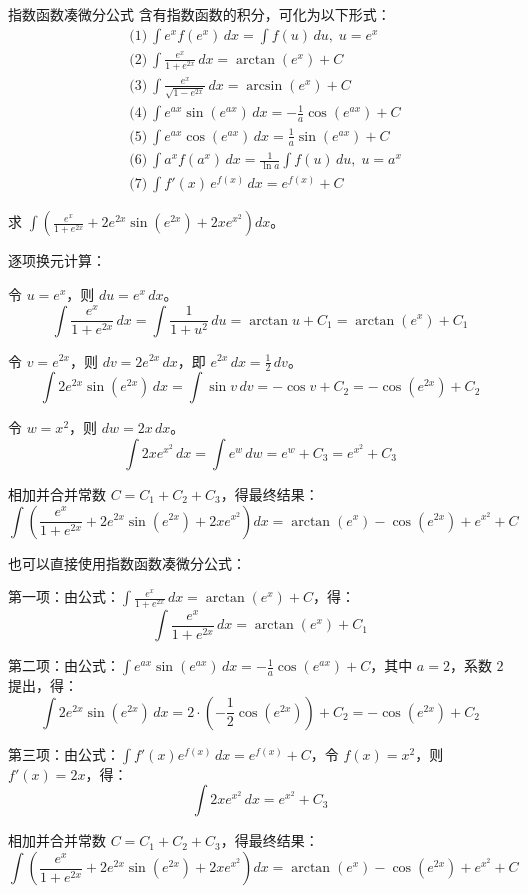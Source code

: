 \begin{theorem}{指数函数凑微分公式}{}
  含有指数函数的积分，可化为以下形式：
  \[
\begin{aligned}
&\text{(1)}\ \int e^{x} f(e^{x}) \,dx = \int f(u)\,du,\; u=e^x \\[4pt]
&\text{(2)}\ \int \frac{e^x}{1+e^{2x}} \,dx = \arctan(e^x)+C \\[4pt]
&\text{(3)}\ \int \frac{e^x}{\sqrt{1-e^{2x}}} \,dx = \arcsin(e^x)+C \\[4pt]
&\text{(4)}\ \int e^{ax}\sin(e^{ax}) \,dx = -\frac{1}{a}\cos(e^{ax})+C \\[4pt]
&\text{(5)}\ \int e^{ax}\cos(e^{ax}) \,dx = \frac{1}{a}\sin(e^{ax})+C \\[4pt]
&\text{(6)}\ \int a^x f(a^x)\,dx = \frac{1}{\ln a}\int f(u)\,du,\; u=a^x \\[4pt]
&\text{(7)}\ \int f'(x)\,e^{f(x)} \,dx = e^{f(x)}+C
\end{aligned}
\]
\end{theorem}

\begin{myexample}
  求 $\int ( \frac{e^{x}}{1+e^{2x}} + 2e^{2x}\sin(e^{2x}) + 2x e^{x^2} ) dx$。

  逐项换元计算：

令 $u = e^{x}$，则 $du = e^{x}\,dx$。
    \[
    \int \frac{e^{x}}{1+e^{2x}}\,dx = \int \frac{1}{1+u^{2}}\,du = \arctan u + C_1 = \arctan(e^{x}) + C_1
    \]

令 $v = e^{2x}$，则 $dv = 2e^{2x}\,dx$，即 $e^{2x}\,dx = \frac{1}{2}\,dv$。
    \[
    \int 2e^{2x}\sin(e^{2x})\,dx = \int \sin v\,dv = -\cos v + C_2 = -\cos(e^{2x}) + C_2
    \]

令 $w = x^{2}$，则 $dw = 2x\,dx$。
    \[
    \int 2x e^{x^{2}}\,dx = \int e^{w}\,dw = e^{w} + C_3 = e^{x^{2}} + C_3
    \]

  相加并合并常数 $C = C_1+C_2+C_3$，得最终结果：
  \[
  \int ( \frac{e^{x}}{1+e^{2x}} + 2e^{2x}\sin(e^{2x}) + 2x e^{x^2} ) dx
  = \arctan(e^x) - \cos(e^{2x}) + e^{x^2} + C
  \]

  也可以直接使用指数函数凑微分公式：

第一项：由公式：$\int \frac{e^x}{1+e^{2x}}\,dx = \arctan(e^x)+C$，得：
    \[
    \int \frac{e^{x}}{1+e^{2x}}\,dx = \arctan(e^x) + C_1
    \]

第二项：由公式：$\int e^{ax}\sin(e^{ax})\,dx = -\frac{1}{a}\cos(e^{ax})+C$，其中 $a=2$，系数 $2$ 提出，得：
    \[
    \int 2e^{2x}\sin(e^{2x})\,dx = 2\cdot(-\frac{1}{2}\cos(e^{2x}))+C_2 = -\cos(e^{2x}) + C_2
    \]

第三项：由公式：$\int f'(x)e^{f(x)}\,dx = e^{f(x)}+C$，令 $f(x)=x^2$，则 $f'(x)=2x$，得：
    \[
    \int 2x e^{x^2}\,dx = e^{x^2} + C_3
    \]

  相加并合并常数 $C = C_1+C_2+C_3$，得最终结果：
  \[
  \int ( \frac{e^{x}}{1+e^{2x}} + 2e^{2x}\sin(e^{2x}) + 2x e^{x^2} ) dx
  = \arctan(e^x) - \cos(e^{2x}) + e^{x^2} + C
  \]
\end{myexample}

